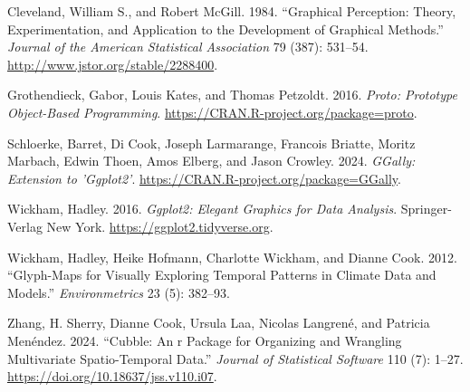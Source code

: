 \label{refs}
\begin{CSLReferences}{1}{0}
Cleveland, William S., and Robert McGill. 1984. {``Graphical Perception: Theory, Experimentation, and Application to the Development of Graphical Methods.''} \emph{Journal of the American Statistical Association} 79 (387): 531--54. \url{http://www.jstor.org/stable/2288400}.

Grothendieck, Gabor, Louis Kates, and Thomas Petzoldt. 2016. \emph{Proto: Prototype Object-Based Programming}. \url{https://CRAN.R-project.org/package=proto}.

Schloerke, Barret, Di Cook, Joseph Larmarange, Francois Briatte, Moritz Marbach, Edwin Thoen, Amos Elberg, and Jason Crowley. 2024. \emph{GGally: Extension to 'Ggplot2'}. \url{https://CRAN.R-project.org/package=GGally}.

Wickham, Hadley. 2016. \emph{Ggplot2: Elegant Graphics for Data Analysis}. Springer-Verlag New York. \url{https://ggplot2.tidyverse.org}.

Wickham, Hadley, Heike Hofmann, Charlotte Wickham, and Dianne Cook. 2012. {``Glyph-Maps for Visually Exploring Temporal Patterns in Climate Data and Models.''} \emph{Environmetrics} 23 (5): 382--93.

Zhang, H. Sherry, Dianne Cook, Ursula Laa, Nicolas Langrené, and Patricia Menéndez. 2024. {``Cubble: An r Package for Organizing and Wrangling Multivariate Spatio-Temporal Data.''} \emph{Journal of Statistical Software} 110 (7): 1--27. \url{https://doi.org/10.18637/jss.v110.i07}.

\end{CSLReferences}


\address{%
Maliny Po\\
Monash University\\%
Department of Econometrics and Business Statistics\\ Melbourne, Australia\\
%
%
\textit{ORCiD: \href{https://orcid.org/0009-0008-4686-6631}{0009-0008-4686-6631}}\\%
\href{mailto:malinypo12@gmail.com}{\nolinkurl{malinypo12@gmail.com}}%
}

\address{%
Nathan Shuyuan Yang\\
Duke University\\%
Durham, North Carolina\\
%
%
\textit{ORCiD: \href{https://orcid.org/0009-0002-9985-1042}{0009-0002-9985-1042}}\\%
\href{mailto:nathan.s.yang@gmail.com}{\nolinkurl{nathan.s.yang@gmail.com}}%
}

